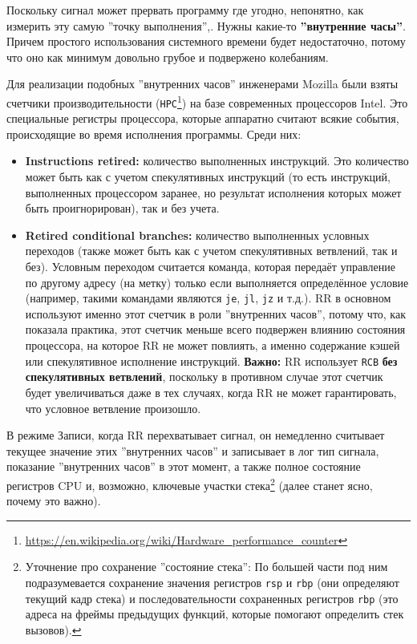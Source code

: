 Поскольку сигнал может
прервать программу где угодно, непонятно, как измерить эту самую ''точку
выполнения'',. Нужны какие-то \textbf{''внутренние часы''}. Причем простого использования
системного времени будет недостаточно, потому что оно как минимум довольно
грубое и подвержено колебаниям.

Для реализации подобных ''внутренних часов'' инженерами Mozilla \cite{rr-paper}
были взяты счетчики производительности
(\texttt{HPC}\footnote{\url{https://en.wikipedia.org/wiki/Hardware_performance_counter}})
на базе современных процессоров Intel. Это специальные регистры процессора,
которые аппаратно считают всякие события, происходящие во время исполнения
программы. Среди них:

\begin{itemize}

  \item \textbf{Instructions retired:} количество выполненных инструкций. Это
  количество может быть как с учетом спекулятивных инструкций (то есть
  инструкций, выполненных процессором заранее, но результат исполнения которых
  может быть проигнорирован), так и без учета.

  \item \textbf{Retired conditional branches:} количество выполненных условных
  переходов (также может быть как с учетом спекулятивных ветвлений, так и без).
  Условным переходом считается команда, которая передаёт управление по другому
  адресу (на метку) только если выполняется определённое условие (например,
  такими командами являются \texttt{je}, \texttt{jl}, \texttt{jz} и т.д.). RR в
  основном используют именно этот счетчик в роли ''внутренних часов'', потому
  что, как показала практика, этот счетчик меньше всего подвержен влиянию
  состояния процессора, на которое RR не может повлиять, а именно содержание
  кэшей или спекулятивное исполнение инструкций. \textbf{Важно:} RR использует
  \texttt{RCB} \textbf{без спекулятивных ветвлений}, поскольку в противном
  случае этот счетчик будет увеличиваться даже в тех случаях, когда RR не может
  гарантировать, что условное ветвление произошло.

\end{itemize}

В режиме Записи, когда RR перехватывает сигнал, он немедленно считывает текущее
значение этих ''внутренних часов'' и записывает в лог тип сигнала, показание
''внутренних часов'' в этот момент, а также полное состояние регистров CPU и,
возможно, ключевые участки стека\footnote{Уточнение про сохранение ''состояние
стека'': По большей части под ним подразумевается сохранение значения регистров
\texttt{rsp} и \texttt{rbp} (они определяют текущий кадр стека) и
последовательности сохраненных регистров \texttt{rbp} (это адреса на фреймы
предыдущих функций, которые помогают определить стек вызовов).} (далее станет
ясно, почему это важно).

